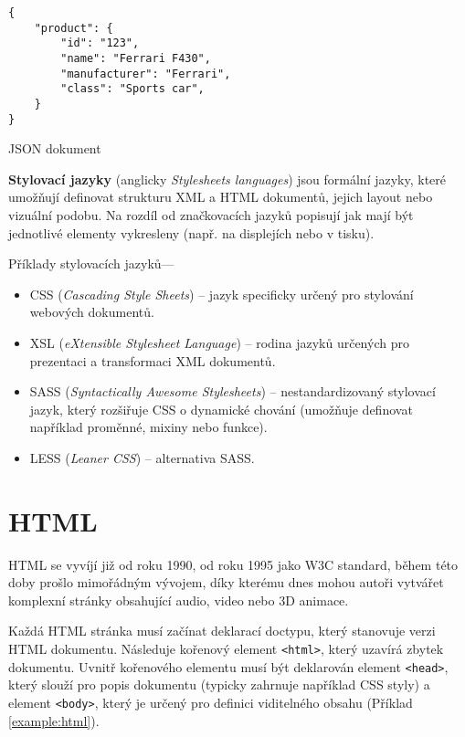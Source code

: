\begin{example}
    \centering
    \begin{lstlisting}
{
    "product": {
        "id": "123",
        "name": "Ferrari F430",
        "manufacturer": "Ferrari",
        "class": "Sports car",
    }
}
    \end{lstlisting}
    \caption{JSON dokument}
    \label{example:json}
\end{example}

\textbf{Stylovací jazyky} (anglicky \textit{Stylesheets languages}) jsou formální jazyky, které umožňují definovat strukturu XML a HTML dokumentů, jejich layout nebo vizuální podobu. Na rozdíl od značkovacích jazyků popisují jak mají být jednotlivé elementy vykresleny (např. na displejích nebo v tisku).

Příklady stylovacích jazyků---

\begin{itemize}
    \item CSS (\textit{Cascading Style Sheets}) -- jazyk specificky určený pro stylování webových dokumentů.
    \item XSL (\textit{eXtensible Stylesheet Language}) -- rodina jazyků určených pro prezentaci a transformaci XML dokumentů.
    \item SASS (\textit{Syntactically Awesome Stylesheets}) -- nestandardizovaný stylovací jazyk, který rozšiřuje CSS o dynamické chování (umožňuje definovat například proměnné, mixiny nebo funkce).
    \item LESS (\textit{Leaner CSS}) -- alternativa SASS.
\end{itemize}

\section{HTML}
\label{sec:html}

HTML se vyvíjí již od roku 1990, od roku 1995 jako W3C standard\footnotemark[1], během této doby prošlo mimořádným vývojem, díky kterému dnes mohou autoři vytvářet komplexní stránky obsahující audio, video nebo 3D animace.

Každá HTML stránka musí začínat deklarací doctypu, který stanovuje verzi HTML dokumentu. Následuje kořenový element \texttt{<html>}, který uzavírá zbytek dokumentu. Uvnitř kořenového elementu musí být deklarován element \texttt{<head>}, který slouží pro popis dokumentu (typicky zahrnuje například CSS styly) a element \texttt{<body>}, který je určený pro definici viditelného obsahu (Příklad \ref{example:html}).

